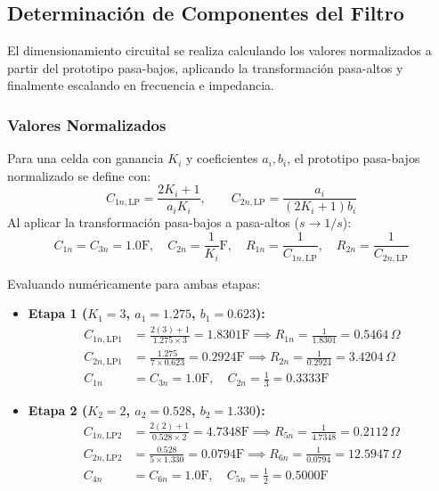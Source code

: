 \subsection{Determinación de Componentes del Filtro}
El dimensionamiento circuital se realiza calculando los valores normalizados a partir del prototipo pasa-bajos,
aplicando la transformación pasa-altos y finalmente escalando en frecuencia e impedancia.

\subsubsection{Valores Normalizados}
Para una celda con ganancia $K_i$ y coeficientes $a_i, b_i$, el prototipo pasa-bajos normalizado se define con:
\begin{equation}
    C_{1n,\text{LP}} = \frac{2K_i + 1}{a_i K_i}, \qquad C_{2n,\text{LP}} = \frac{a_i}{(2K_i + 1) b_i}
\end{equation}
Al aplicar la transformación pasa-bajos a pasa-altos ($s \to 1/s$):
\begin{equation}
    C_{1n} = C_{3n} = 1.0 \unit{\farad}, \quad C_{2n} = \frac{1}{K_i} \unit{\farad}, \quad R_{1n} = \frac{1}{C_{1n,\text{LP}}}, \quad R_{2n} = \frac{1}{C_{2n,\text{LP}}}
\end{equation}

Evaluando numéricamente para ambas etapas:
\begin{itemize}
    \item \textbf{Etapa 1 ($K_1 = 3$, $a_1 = 1.275$, $b_1 = 0.623$):}
        \begin{align*}
            C_{1n,\text{LP1}} &= \frac{2(3) + 1}{1.275 \times 3} = 1.8301 \unit{\farad} \implies R_{1n} = \frac{1}{1.8301} = 0.5464 \,\Omega \\
            C_{2n,\text{LP1}} &= \frac{1.275}{7 \times 0.623} = 0.2924 \unit{\farad} \implies R_{2n} = \frac{1}{0.2924} = 3.4204 \,\Omega \\
            C_{1n} &= C_{3n} = 1.0 \unit{\farad}, \quad C_{2n} = \frac{1}{3} = 0.3333 \unit{\farad}
        \end{align*}

    \item \textbf{Etapa 2 ($K_2 = 2$, $a_2 = 0.528$, $b_2 = 1.330$):}
        \begin{align*}
            C_{1n,\text{LP2}} &= \frac{2(2) + 1}{0.528 \times 2} = 4.7348 \unit{\farad} \implies R_{5n} = \frac{1}{4.7348} = 0.2112 \,\Omega \\
            C_{2n,\text{LP2}} &= \frac{0.528}{5 \times 1.330} = 0.0794 \unit{\farad} \implies R_{6n} = \frac{1}{0.0794} = 12.5947 \,\Omega \\
            C_{4n} &= C_{6n} = 1.0 \unit{\farad}, \quad C_{5n} = \frac{1}{2} = 0.5000 \unit{\farad}
        \end{align*}
\end{itemize}

